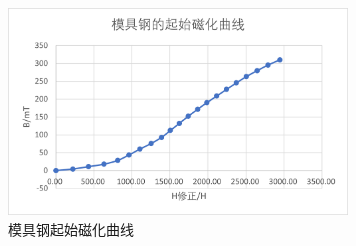\documentclass[11pt]{article}
\begin{document}
\begin{enumerate}
\begin{table}[H]
\begin{tabular}{|c|c|c|c|c|c|c|c|}
            \end{tabular}%
          \label{tab:模具钢起始磁化曲线}%
        \end{table}%
        \begin{figure}[H]
            \centering
            \includegraphics[width=9cm]{Fig/9.png}
            \caption{模具钢起始磁化曲线}
        \end{figure}


\end{enumerate}
\end{document}
